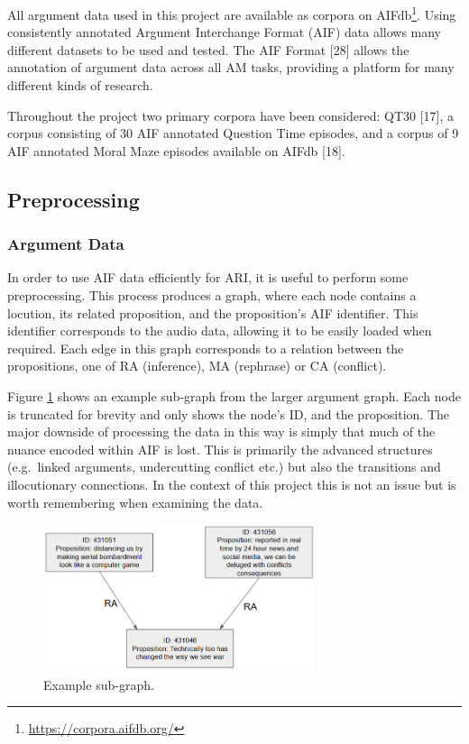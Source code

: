 \documentclass[twocolumn,twoside]{article}
\begin{document}
All argument data used in this project are available as corpora on
AIFdb\footnote{\url{https://corpora.aifdb.org/}}. Using consistently annotated
Argument Interchange Format (AIF) data allows many different datasets to
be used and tested. The AIF Format {[}28{]} allows the annotation of
argument data across all AM tasks, providing a platform for many
different kinds of research.

Throughout the project two primary corpora have been considered: QT30
{[}17{]}, a corpus consisting of 30 AIF annotated Question Time
episodes, and a corpus of 9 AIF annotated Moral Maze episodes available
on AIFdb {[}18{]}.

\subsection{Preprocessing}\label{preprocessing}

\subsubsection{Argument Data}\label{sec:arg-data}

In order to use AIF data efficiently for ARI, it is useful to perform
some preprocessing. This process produces a graph, where each node
contains a locution, its related proposition, and the proposition's AIF
identifier. This identifier corresponds to the audio data, allowing it
to be easily loaded when required. Each edge in this graph corresponds
to a relation between the propositions, one of RA (inference), MA
(rephrase) or CA (conflict).

Figure \ref{fig:arg-map} shows an example sub-graph from the larger
argument graph. Each node is truncated for brevity and only shows the
node's ID, and the proposition. The major downside of processing the
data in this way is simply that much of the nuance encoded within AIF is
lost. This is primarily the advanced structures (e.g.~linked arguments,
undercutting conflict etc.) but also the transitions and illocutionary
connections. In the context of this project this is not an issue but is
worth remembering when examining the data.

\begin{figure}[h]
\centering
\includegraphics[width=8cm]{argument-map}
\caption{Example sub-graph. \label{fig:arg-map}}
\end{figure}
\end{document}

